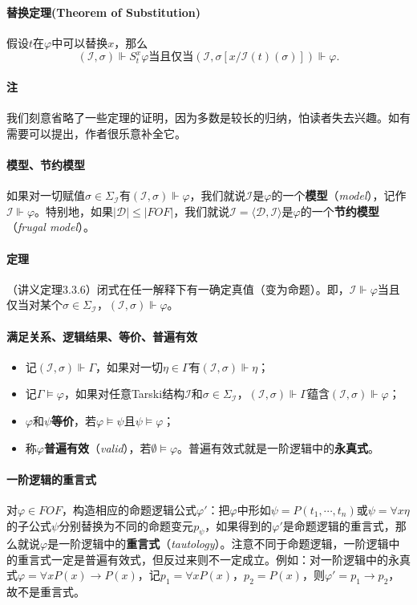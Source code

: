 \documentclass[b5paper,oneside]{ctexbook}
\begin{document}
\paragraph{替换定理(Theorem of Substitution)}假设$t$在$\varphi$中可以替换$x$，那么
\[(\mathscr I,\sigma)\Vdash S_t^x\varphi\text{当且仅当}(\mathscr I,\sigma [x/\mathscr I(t)(\sigma)])\Vdash\varphi.\]
\paragraph{注}我们刻意省略了一些定理的证明，因为多数是较长的归纳，怕读者失去兴趣。如有需要可以提出，作者很乐意补全它。
\paragraph{模型、节约模型}如果对一切赋值$\sigma\in\Sigma_\mathscr I$有$(\mathscr I,\sigma)\Vdash\varphi$，我们就说$\mathscr I$是$\varphi$的一个\textbf{模型}（\textit{model}），记作$\mathscr I\Vdash\varphi$。特别地，如果$|\mathcal{D}|\leq |FOF|$，我们就说$\mathscr I=\langle\mathcal D,\mathcal I\rangle$是$\varphi$的一个\textbf{节约模型}（\textit{frugal model}）。
\paragraph{定理}（讲义定理3.3.6）闭式在任一解释下有一确定真值（变为命题）。即，$\mathscr I\Vdash\varphi$当且仅当对某个$\sigma\in\Sigma_\mathscr I$，$(\mathscr I,\sigma)\Vdash\varphi$。

\paragraph{满足关系、逻辑结果、等价、普遍有效}
\begin{itemize}
\item 记$(\mathscr I,\sigma)\Vdash\Gamma$，如果对一切$\eta\in\Gamma$有$(\mathscr I,\sigma)\Vdash\eta$；
\item 记$\Gamma\models\varphi$，如果对任意Tarski结构$\mathscr I$和$\sigma\in\Sigma_\mathscr I$，$(\mathscr I,\sigma)\Vdash\Gamma$蕴含$(\mathscr I,\sigma)\Vdash\varphi$；
\item $\varphi$和$\psi$\textbf{等价}，若$\varphi\models\psi$且$\psi\models\varphi$；
\item 称$\varphi$\textbf{普遍有效}（\textit{valid}），若$\emptyset\models\varphi$。普遍有效式就是一阶逻辑中的\textbf{永真式}。
\end{itemize}

\paragraph{一阶逻辑的重言式}对$\varphi\in FOF$，构造相应的命题逻辑公式$\varphi '$：把$\varphi$中形如$\psi=P(t_1,\cdots ,t_n)$或$\psi =\forall x\eta$的子公式$\psi$分别替换为不同的命题变元$p_\psi$，如果得到的$\varphi'$是命题逻辑的重言式，那么就说$\varphi$是一阶逻辑中的\textbf{重言式}（\textit{tautology}）。注意不同于命题逻辑，一阶逻辑中的重言式一定是普遍有效式，但反过来则不一定成立。例如：对一阶逻辑中的永真式$\varphi=\forall xP(x)\to P(x)$，记$p_1=\forall xP(x)$，$p_2=P(x)$，则$\varphi'=p_1\to p_2$，故不是重言式。
\end{document}
